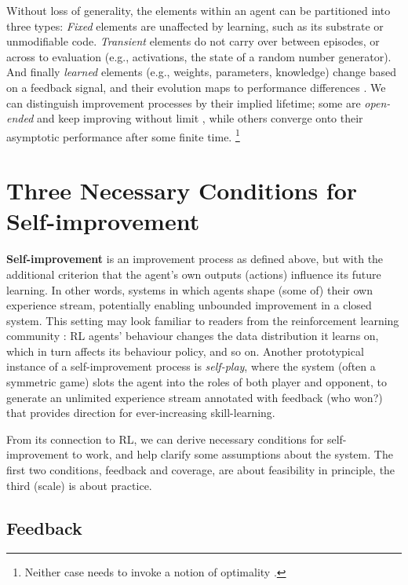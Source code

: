 \documentclass[dvipsnames]{article} %
\begin{document}
Without loss of generality, the elements within an agent can be partitioned into three types: \emph{Fixed} elements are unaffected by learning, such as its substrate or unmodifiable code. \emph{Transient} elements do not carry over between episodes, or across to evaluation (e.g., activations, the state of a random number generator). And finally \emph{learned} elements (e.g., weights, parameters, knowledge) change based on a feedback signal, and their evolution maps to performance differences \citep{lu2023reinforcement}.
We can distinguish improvement processes by their implied lifetime; 
some are \emph{open-ended} and keep improving without limit \citep{hughes2024open},
while others converge onto their asymptotic performance after some finite time.%
\footnote{Neither case needs to invoke a notion of optimality \citep{abel2024three}.}



\section{Three Necessary Conditions for Self-improvement}



{\bf Self-improvement} is an improvement process as defined above, but with the additional criterion that the agent's own outputs (actions) influence its future learning. In other words, systems in which agents shape (some of) their own experience stream, potentially enabling unbounded improvement in a closed system.
This setting may look familiar to readers from the reinforcement learning community \citep[RL;][]{sutton2018book}: RL agents' behaviour changes the data distribution it learns on, which in turn affects its behaviour policy, and so on.
Another prototypical instance of a self-improvement process is \emph{self-play}, where the system (often a symmetric game) slots the agent into the roles of both player and opponent, to generate an unlimited experience stream annotated with feedback (who won?) that provides direction for ever-increasing skill-learning.

From its connection to RL, we can derive necessary conditions for self-improvement to work, and help clarify some assumptions about the system. The first two conditions, feedback and coverage, are about feasibility in principle, the third (scale) is about practice.


\subsection{Feedback}
\label{sec:feedback}
\end{document}
